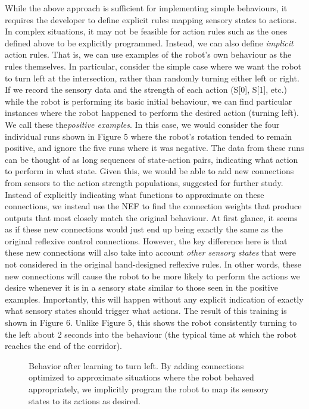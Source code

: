 \documentclass[conference]{IEEEtran}
\begin{document}
While the above approach is sufficient for implementing
simple behaviours, it requires the developer to define explicit
rules mapping sensory states to actions. In complex
situations, it may not be feasible for action rules such as the
ones defined above to be explicitly programmed. Instead,
we can also define \textit{implicit} action rules. That is, we can use
examples of the robot's own behaviour as the rules
themselves.
In particular, consider the simple case where we want the
robot to turn left at the intersection, rather than randomly
turning either left or right. If we record the sensory data
and the strength of each action (S[0], S[1], etc.) while the
robot is performing its basic initial behaviour, we can find
particular instances where the robot happened to perform
the desired action (turning left). We call these the\textit{positive examples}. In this case, we would consider the four
individual runs shown in Figure 5 where the robot's rotation
tended to remain positive, and ignore the five runs where it
was negative.
The data from these runs can be thought of as long
sequences of state-action pairs, indicating what action to
perform in what state. Given this, we would be able to add new
connections from sensors to the action strength populations, suggested for further study.
Instead of explicitly indicating what functions to
approximate on these connections, we instead use the NEF
to find the connection weights that produce outputs that
most closely match the original behaviour.
At first glance, it seems as if these new connections
would just end up being exactly the same as the original
reflexive control connections. However, the key difference
here is that these new connections will also take into
account \textit{other sensory states} that were not considered in the
original hand-designed reflexive rules. In other words,
these new connections will cause the robot to be more likely
to perform the actions we desire whenever it is in a sensory
state similar to those seen in the positive examples.
Importantly, this will happen without any explicit indication
of exactly what sensory states should trigger what actions.
The result of this training is shown in Figure 6. Unlike
Figure 5, this shows the robot consistently turning to the left
about 2 seconds into the behaviour (the typical time at which
the robot reaches the end of the corridor).

\begin{figure}[!t]
\label{Left}
\centering
\caption{Behavior after learning to turn left. By adding connections
optimized to approximate situations where the robot behaved appropriately,
we implicitly program the robot to map its sensory states to its actions as
desired.}
\end{figure}
\end{document}
